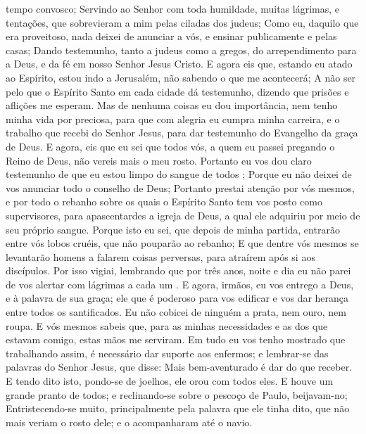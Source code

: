 {{} tempo convosco;
  Servindo ao Senhor com toda humildade, muitas lágrimas, e tentações, que sobrevieram a mim pelas ciladas dos judeus;
  Como eu, daquilo que
{} era proveitoso, nada deixei de anunciar a vós, e ensinar publicamente e pelas casas;
  Dando testemunho, tanto a judeus como a gregos, do arrependimento para
{} a Deus, e da fé em nosso Senhor Jesus Cristo.
  E agora eis que, estando eu atado ao Espírito, estou indo a Jerusalém, não sabendo o que me acontecerá;
  A não ser pelo que o Espírito Santo em cada cidade
{} dá testemunho, dizendo que prisões e aflições me esperam.
  Mas de nenhuma
{} coisas eu dou importância, nem tenho minha vida por preciosa, para que com alegria eu cumpra minha carreira, e o trabalho que recebi do Senhor Jesus, para dar testemunho do Evangelho da graça de Deus.
  E agora, eis que eu sei que todos vós, a quem eu passei pregando o Reino de Deus, não vereis mais o meu rosto.
  Portanto eu vos dou claro testemunho de que eu estou limpo do sangue de todos
{} ;
  Porque eu não deixei de vos anunciar todo o conselho de Deus;
  Portanto prestai atenção por vós mesmos, e por todo o rebanho sobre os quais o Espírito Santo tem vos posto como supervisores,
 para apascentardes a igreja de Deus, a qual ele adquiriu por meio de seu próprio sangue.
  Porque isto eu sei, que depois de minha partida, entrarão entre vós lobos cruéis, que não pouparão ao rebanho;
  E que dentre vós mesmos se levantarão homens a falarem coisas perversas, para atraírem após si aos discípulos.
  Por isso vigiai, lembrando que por três anos, noite e dia eu não parei de vos alertar com lágrimas a cada um
{} .
  E agora, irmãos, eu vos entrego a Deus, e à palavra de sua graça; ele que é poderoso para vos edificar e vos dar herança entre todos os santificados.
  Eu não cobicei de ninguém a prata, nem ouro, nem roupa.
  E vós mesmos sabeis que, para as minhas necessidades e as dos que estavam comigo, estas
{} mãos me serviram.
  Em tudo eu vos tenho mostrado que trabalhando assim, é necessário dar suporte aos enfermos; e lembrar-se das palavras do Senhor Jesus, que disse: Mais bem-aventurado é dar do que receber.
  E tendo dito isto, pondo-se de joelhos, ele orou com todos eles.
  E houve um grande pranto de todos; e reclinando-se sobre o pescoço de Paulo, beijavam-no;
  Entristecendo-se muito, principalmente pela palavra que ele tinha dito, que não mais veriam o rosto dele; e o acompanharam até o navio.
\par }

